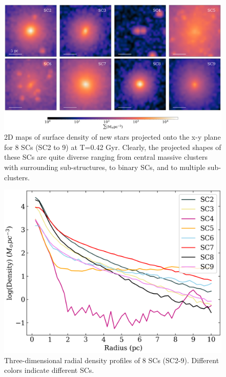 \documentclass[fleqn,usenatbib]{mnras}
\begin{document}
\begin{figure}
 \centering
 \includegraphics[width=15cm]{9..png}
 \caption{2D maps of surface density of new stars projected onto the x-y plane for 8 SCs (SC2 to 9) at T=0.42 Gyr. Clearly, the projected shapes of these SCs are quite diverse ranging from central massive clusters with surrounding sub-structures, to binary SCs, and to multiple sub-clusters.}
 \label{fig:8Clusterall}
\end{figure}

\begin{figure}
 \includegraphics[width=\columnwidth]{10HELLO..step.png} %
 \caption{Three-dimensional radial density profiles of 8 SCs (SC2-9). Different colors indicate different SCs.}
 \label{fig:9RadAll}
\end{figure}
\end{document}

